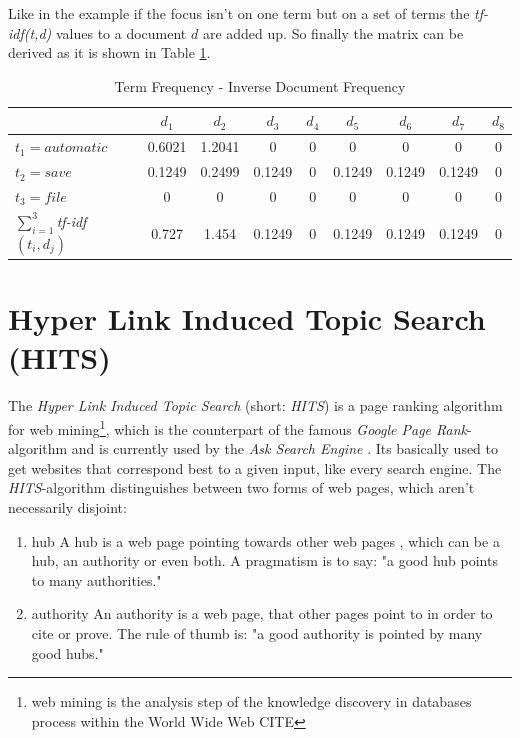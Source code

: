 Like in the example if the focus isn't on one term but on a set of terms the \emph{tf-idf(t,d)} values to a document $d$ are added up. So finally the matrix can be derived as it is shown in Table \ref{tab:tfidf_table}.

\begin{table}[h]
  \centering
  \begin{tabular}{| l | c | c | c | c | c | c | c | c |}
    \hline
    & $d_1$ & $d_2$ & $d_3$ & $d_4$ & $d_5$ & $d_6$ & $d_7$ & $d_8$ \\ \hline
    $t_1 = automatic$ & 0.6021 & 1.2041 & 0 & 0 & 0 & 0 & 0 & 0 \\ \hline
    $t_2 = save$ & 0.1249 & 0.2499 & 0.1249 &0 & 0.1249 & 0.1249 & 0.1249 & 0 \\ \hline
    $t_3 = file $ & 0 & 0 & 0 & 0 & 0 & 0 & 0 & 0 \\ \hline \hline
    $\sum\nolimits_{i=1}^3$\emph{tf-idf}$(t_i,d_j)$ & 0.727 & 1.454 & 0.1249 & 0 & 0.1249 & 0.1249 & 0.1249 & 0\\ \hline
  \end{tabular}
  \label{tab:tfidf_table}
  \caption{Term Frequency - Inverse Document Frequency}
\end{table}

\section{Hyper Link Induced Topic Search (HITS)}
\label{sec:HITS}
The \emph{Hyper Link Induced Topic Search} (short: \emph{HITS}) is a page ranking algorithm for web mining\footnote{\label{foot:1}web mining is the analysis step of the knowledge discovery in databases process within the World Wide Web CITE}, which is the counterpart of the famous \emph{Google Page Rank}-algorithm and is currently used by the \emph{Ask Search Engine} \cite{wiki:HITS}. Its basically used to get websites that correspond best to a given input, like every search engine. 
The \emph{HITS}-algorithm distinguishes between two forms of web pages, which aren't necessarily disjoint:
\begin{enumerate}
  \item hub \newline
  A hub is a web page pointing towards other web pages , which can be a hub, an authority or even both. A pragmatism is to say: "a good hub points to many authorities."
  \item authority \newline
  An authority is a web page, that other pages point to in order to cite or prove. The rule of thumb is: "a good authority is pointed by many good hubs."
\end{enumerate}

